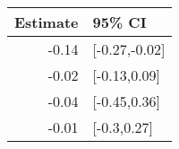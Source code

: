 \begin{tabular}{rl}
  \hline
Estimate & 95\% CI \\ 
  \hline
-0.14 & [-0.27,-0.02] \\ 
  -0.02 & [-0.13,0.09] \\ 
  -0.04 & [-0.45,0.36] \\ 
  -0.01 & [-0.3,0.27] \\ 
   \hline
\end{tabular}

